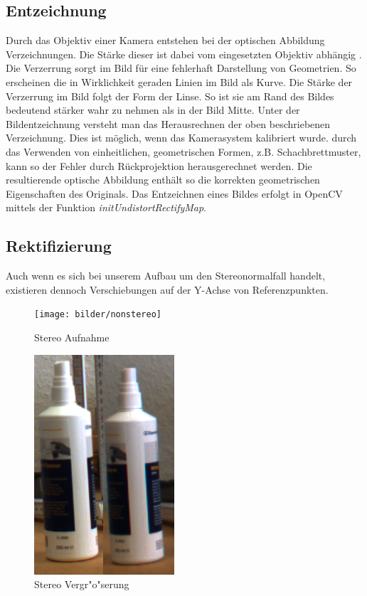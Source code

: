 \subsection{Entzeichnung}
\label{sec:entzeichnung}

Durch das Objektiv einer Kamera entstehen bei der optischen Abbildung Verzeichnungen. Die Stärke dieser ist dabei vom eingesetzten Objektiv abhängig \cite{wie}. Die Verzerrung sorgt im Bild für eine fehlerhaft Darstellung von Geometrien. So erscheinen die in Wirklichkeit geraden Linien im Bild als Kurve.
Die Stärke der Verzerrung im Bild folgt der Form der Linse. So ist sie am Rand des Bildes bedeutend stärker wahr zu nehmen als in der Bild Mitte.\newline
\noindent Unter der Bildentzeichnung versteht man das Herausrechnen der oben beschriebenen Verzeichnung. Dies ist möglich, wenn das Kamerasystem kalibriert wurde. durch das Verwenden von einheitlichen, geometrischen Formen, z.B. Schachbrettmuster, kann so der Fehler durch Rückprojektion herausgerechnet werden. Die resultierende optische Abbildung enthält so die korrekten geometrischen Eigenschaften des Originals. Das Entzeichnen eines Bildes erfolgt in OpenCV mittels der Funktion \textit{initUndistortRectifyMap}.

\subsection{Rektifizierung}
\label{sec:rektifizierung}

\noindent Auch wenn es sich bei unserem Aufbau um den Stereonormalfall handelt, existieren dennoch Verschiebungen auf der Y-Achse von Referenzpunkten.

\begin{figure}[H]
	\texttt{[image: bilder/nonstereo]}
	\caption[Stereo Szenenaufnahme]{Stereo Aufnahme}
	\label{fig:steresene}%
\end{figure}

\begin{figure}[H]
	\includegraphics[scale=0.4]{bilder/nonparallal}
	\caption[Stereo Vergr"o"serung]{Stereo Vergr"o"serung}
	\label{fig:vergr}%
\end{figure}

